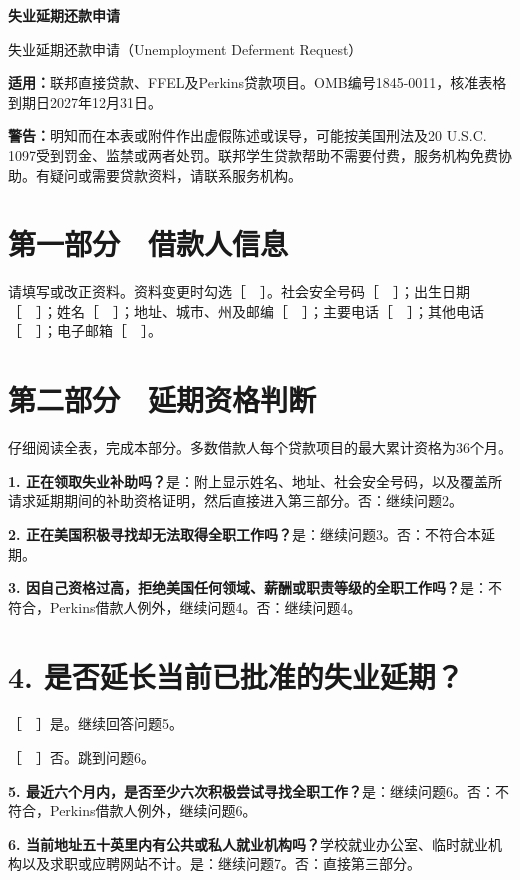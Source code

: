 \documentclass[UTF8,fontset=none,11pt,a4paper]{ctexart}
\begin{document}
{\noindent\fontsize{20}{25}\selectfont\bfseries 失业延期还款申请\par}
\vspace{10pt}
失业延期还款申请（Unemployment Deferment Request）


\textbf{适用：}联邦直接贷款、FFEL及Perkins贷款项目。OMB编号1845-0011，核准表格到期日2027年12月31日。


\textbf{警告：}明知而在本表或附件作出虚假陈述或误导，可能按美国刑法及20 U.S.C. 1097受到罚金、监禁或两者处罚。联邦学生贷款帮助不需要付费，服务机构免费协助。有疑问或需要贷款资料，请联系服务机构。


\section*{第一部分　借款人信息}
请填写或改正资料。资料变更时勾选［　］。社会安全号码［　］；出生日期［　］；姓名［　］；地址、城市、州及邮编［　］；主要电话［　］；其他电话［　］；电子邮箱［　］。


\section*{第二部分　延期资格判断}
仔细阅读全表，完成本部分。多数借款人每个贷款项目的最大累计资格为36个月。


\textbf{1. 正在领取失业补助吗？}是：附上显示姓名、地址、社会安全号码，以及覆盖所请求延期期间的补助资格证明，然后直接进入第三部分。否：继续问题2。


\textbf{2. 正在美国积极寻找却无法取得全职工作吗？}是：继续问题3。否：不符合本延期。


\textbf{3. 因自己资格过高，拒绝美国任何领域、薪酬或职责等级的全职工作吗？}是：不符合，Perkins借款人例外，继续问题4。否：继续问题4。


\section*{4. 是否延长当前已批准的失业延期？}
［　］是。继续回答问题5。


［　］否。跳到问题6。


\textbf{5. 最近六个月内，是否至少六次积极尝试寻找全职工作？}是：继续问题6。否：不符合，Perkins借款人例外，继续问题6。


\textbf{6. 当前地址五十英里内有公共或私人就业机构吗？}学校就业办公室、临时就业机构以及求职或应聘网站不计。是：继续问题7。否：直接第三部分。
\end{document}
